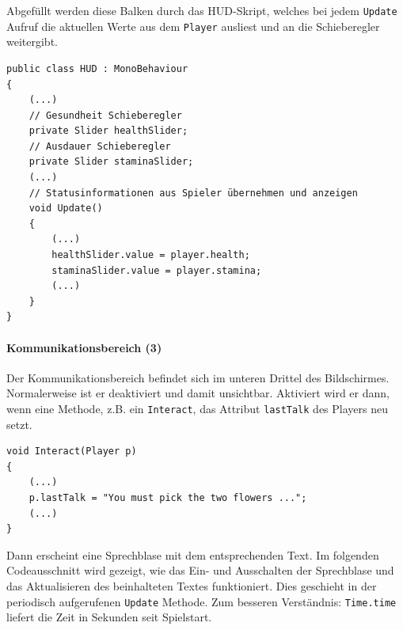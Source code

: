 \noindent Abgefüllt werden diese Balken durch das HUD-Skript, welches bei jedem \lstinline{Update} Aufruf die aktuellen Werte aus dem \lstinline{Player} ausliest und an die Schieberegler weitergibt.

\begin{lstlisting}[caption={Schieberegler aktualisieren}]
public class HUD : MonoBehaviour
{
	(...)
	// Gesundheit Schieberegler
	private Slider healthSlider;
	// Ausdauer Schieberegler
	private Slider staminaSlider;
	(...)
	// Statusinformationen aus Spieler übernehmen und anzeigen
	void Update()
	{
		(...)
		healthSlider.value = player.health;
		staminaSlider.value = player.stamina;
		(...)
	}
}
\end{lstlisting}

\paragraph{Kommunikationsbereich (3)}
Der Kommunikationsbereich befindet sich im unteren Drittel des Bildschirmes.
Normalerweise ist er deaktiviert und damit unsichtbar.
Aktiviert wird er dann, wenn eine Methode, z.B. ein \lstinline{Interact}, das Attribut \lstinline{lastTalk} des Players neu setzt. 

\begin{lstlisting}[caption={Kommunikation setzen}]
void Interact(Player p)
{
	(...)
	p.lastTalk = "You must pick the two flowers ...";
	(...)
}
\end{lstlisting}

Dann erscheint eine Sprechblase mit dem entsprechenden Text. Im folgenden Codeausschnitt wird gezeigt, wie das Ein- und Ausschalten der Sprechblase und  das Aktualisieren des beinhalteten Textes funktioniert. Dies geschieht in der periodisch aufgerufenen \lstinline{Update} Methode. Zum besseren Verständnis: \lstinline{Time.time} liefert die Zeit in Sekunden seit Spielstart.

